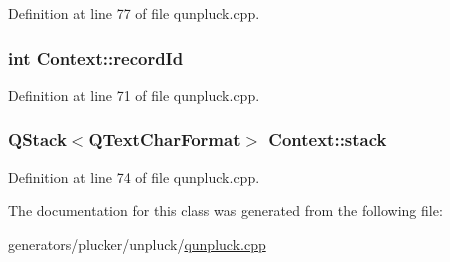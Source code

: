 Definition at line 77 of file qunpluck.\+cpp.

\hypertarget{classContext_a6e4cebbb704fa78d95c23d1fc86623c6}{
\subsubsection[{record\+Id}]{\setlength{\rightskip}{0pt plus 5cm}int Context\+::record\+Id}}\label{classContext_a6e4cebbb704fa78d95c23d1fc86623c6}


Definition at line 71 of file qunpluck.\+cpp.

\hypertarget{classContext_a8ff44a70b52b8aefe89b4a4626b72fb3}{
\subsubsection[{stack}]{\setlength{\rightskip}{0pt plus 5cm}Q\+Stack$<$Q\+Text\+Char\+Format$>$ Context\+::stack}}\label{classContext_a8ff44a70b52b8aefe89b4a4626b72fb3}


Definition at line 74 of file qunpluck.\+cpp.



The documentation for this class was generated from the following file\+:\begin{DoxyCompactItemize}
\item 
generators/plucker/unpluck/\hyperlink{qunpluck_8cpp}{qunpluck.\+cpp}\end{DoxyCompactItemize}

